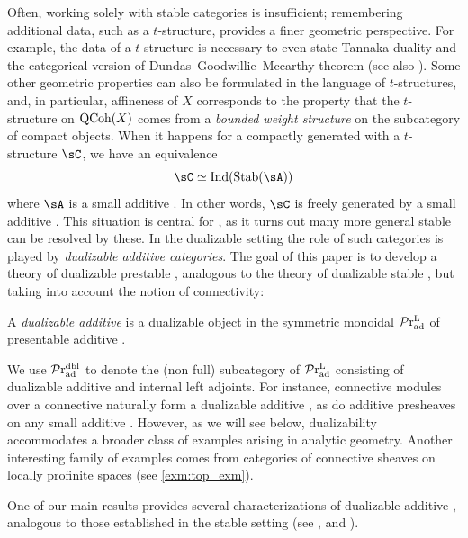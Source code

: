 \documentclass[a4paper,10pt, oneside]{amsart}
\begin{document}
Often, working solely with stable categories is insufficient; remembering  additional data, such as a $t$-structure, provides a finer geometric perspective.
For example, the data of a $t$-structure is necessary to even state Tannaka duality \cite[Theorem~9.2.0.2]{SAG} and the categorical version of 
Dundas--Goodwillie--Mccarthy theorem \cite[Section~5]{levy2025c} (see also \cite[Theorem~1.0.1]{dgm-elden-vova}).
Some other geometric properties can also be formulated in the language of $t$-structures, and, 
in particular, affineness of $X$ corresponds to the property that the $t$-structure on $\mathrm{QCoh}(X)$ comes from a {\it bounded weight structure} on the subcategory of compact objects. 
When it happens for a compactly generated \infcat with a $t$-structure $\sC$, we have an equivalence 
\[
	\sC \simeq \ind(\op{Stab}(\sA))
\]
where $\sA$ is a small additive \infcat. In other words, $\sC$ is freely generated by a small additive \infcat. This situation is central for \cite{levy2025c}, as it turns out 
many more general stable \infcats can be resolved by these. 
In the dualizable setting the role of such categories is played by {\it dualizable additive categories}. 
The goal of this paper is to develop a theory of dualizable prestable \infcats, analogous to the theory of dualizable stable \infcats,
but taking into account the notion of connectivity:

\begin{de}\label{dfn:dual_add}
	A \emph{dualizable additive \infcat} is a dualizable object in the 
	symmetric monoidal \infcat $\mathcal{P}\mathrm{r}_{\mathrm{ad}}^\mathrm{L}$ of presentable additive \infcats.
\end{de}

We use $\mathcal{P}\mathrm{r}_{\mathrm{ad}}^{\mathrm{dbl}}$ to denote the (non full) subcategory of $\mathcal{P}\mathrm{r}_{\mathrm{ad}}^\mathrm{L}$ consisting of dualizable additive \infcats and internal left adjoints.
For instance, connective modules over a connective \eonering naturally form a dualizable additive 
\infcat, as do additive presheaves on any small additive \infcat. However, as we will see below, 
dualizability accommodates a broader class of examples arising in analytic geometry. 
Another interesting family of examples comes from categories of connective 
sheaves on locally profinite spaces (see  \cref{exm:top_exm}).

One of our main results provides several characterizations of dualizable additive \infcats, analogous to those established in the stable setting (see \cite[Proposition D.7.3.1]{SAG}, \cite{efimov2024k} and \cite{ramzi2024dualizable}).
\end{document}
